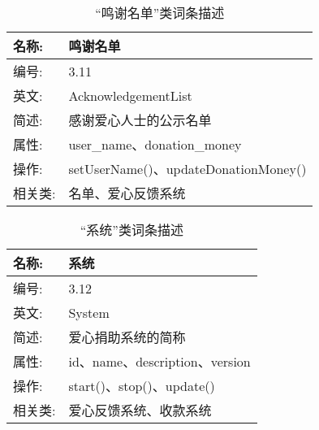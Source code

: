 \begin{table}[H]  
\caption{“鸣谢名单”类词条描述}  
\begin{center}  
    \begin{tabular}{l p{11cm}} 
        \hline
        \quad 名称:  &  鸣谢名单 \\
        \hline
        \quad 编号:  & 3.11 \\
        \hline
        \quad 英文:  &  AcknowledgementList \\
        \hline
        \quad 简述:  & 感谢爱心人士的公示名单 \\
        \hline
        \quad 属性:  & user\_name、donation\_money\\
        \hline
        \quad 操作:  & setUserName()、updateDonationMoney()
\\
        \hline
        \quad 相关类:  & 名单、爱心反馈系统 \\
        \hline
    \end{tabular}
\end{center}
\end{table}

\begin{table}[H]  
\caption{“系统”类词条描述}  
\begin{center}  
    \begin{tabular}{l p{11cm}} 
        \hline
        \quad 名称:  &  系统 \\
        \hline
        \quad 编号:  & 3.12 \\
        \hline
        \quad 英文:  &  System \\
        \hline
        \quad 简述:  & 爱心捐助系统的简称 \\
        \hline
        \quad 属性:  & id、name、description、version\\
        \hline
        \quad 操作:  & start()、stop()、update()\\
        \hline
        \quad 相关类:  & 爱心反馈系统、收款系统 \\
        \hline
    \end{tabular}
\end{center}
\end{table}

